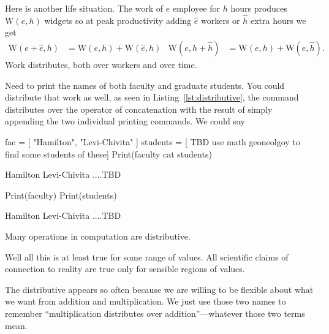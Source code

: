 Here is another life situation.  The work of $e$ employee for $h$ hours produces 
$\text{W}(e,h)$ widgets
so at peak productivity adding $\hat{e}$ workers or $\hat{h}$ extra hours we get
\begin{align*}
    \text{W}(e+\hat{e},h)& =\text{W}(e,h)+\text{W}(\hat{e},h)
    &
    \text{W}(e,h+\hat{h})& =\text{W}(e,h)+\text{W}(e,\hat{h}).
\end{align*}
Work distributes, both over workers and over time.

Need to print the names of both faculty and graduate students. 
You could distribute that work as well, as seen in Listing~\ref{lst:distributive},
the command  distributes over the operator of concatenation 
with the result of simply appending the two individual printing commands.
We could say 
\begin{center}
\end{center}

\begin{lstfloat}
\begin{notebookin}
fac = [ "Hamilton", "Levi-Chivita" ]
students = [ TBD use math geoneolgoy to find some students of these]
Print(faculty cat students)
\end{notebookin}
\begin{notebookout}
Hamilton
Levi-Chivita
....TBD
\end{notebookout}
\begin{notebookin}
Print(faculty)
Print(students)
\end{notebookin}
\begin{notebookout}
Hamilton
Levi-Chivita
....TBD
\end{notebookout}
\caption{Many operations in computation are distributive.}\label{lst:distributive}
\end{lstfloat}

Well all this is at least true for some range of values.  All scientific
claims of connection to reality are true only for sensible regions of values.

The distributive appears so often because we are willing to be flexible about 
what we want from addition and multiplication.  We just use those two names 
to remember ``multiplication distributes over addition''---whatever those two 
terms mean.

